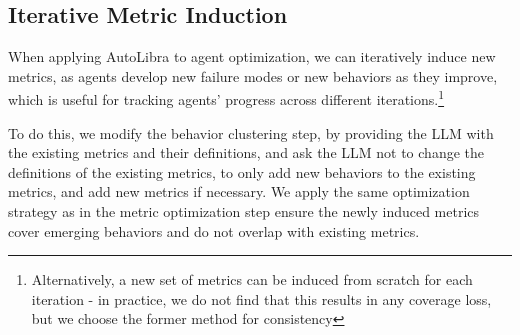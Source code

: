 


\subsection{Iterative Metric Induction}
\label{sec:iterative-induction}
When applying AutoLibra to agent optimization, we can iteratively induce new metrics, as agents develop new failure modes or new behaviors as they improve, which is useful for tracking agents' progress across different iterations.\footnote{Alternatively, a new set of metrics can be induced from scratch for each iteration -  in practice, we do not find that this results in any coverage loss, but we choose the former method for consistency} 


To do this, we modify the behavior clustering step, by providing the LLM with the existing metrics
and their definitions, and ask the LLM not to change the definitions of the existing metrics, 
to only add new behaviors to the existing metrics, and add new metrics if necessary.
We apply the same optimization strategy as in the metric optimization step
ensure the newly induced metrics cover emerging behaviors and do not overlap with existing metrics.

